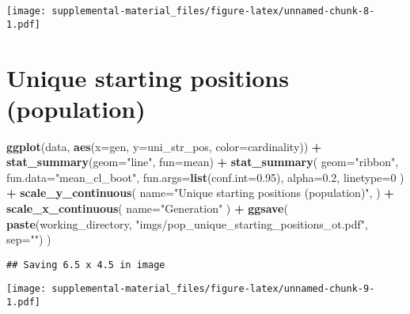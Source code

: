 \documentclass[]{book}
\newenvironment{Shaded}{\begin{snugshade}}{\end{snugshade}}
\newcommand{\DataTypeTok}[1]{\textcolor[rgb]{0.13,0.29,0.53}{#1}}
\newcommand{\DecValTok}[1]{\textcolor[rgb]{0.00,0.00,0.81}{#1}}
\newcommand{\FloatTok}[1]{\textcolor[rgb]{0.00,0.00,0.81}{#1}}
\newcommand{\KeywordTok}[1]{\textcolor[rgb]{0.13,0.29,0.53}{\textbf{#1}}}
\newcommand{\NormalTok}[1]{#1}
\newcommand{\OperatorTok}[1]{\textcolor[rgb]{0.81,0.36,0.00}{\textbf{#1}}}
\newcommand{\StringTok}[1]{\textcolor[rgb]{0.31,0.60,0.02}{#1}}
\begin{document}
\texttt{[image: supplemental-material\_files/figure-latex/unnamed-chunk-8-1.pdf]}

\hypertarget{unique-starting-positions-population}{%
\section{Unique starting positions (population)}\label{unique-starting-positions-population}}

\begin{Shaded}
\begin{Highlighting}[]
\KeywordTok{ggplot}\NormalTok{(data, }\KeywordTok{aes}\NormalTok{(}\DataTypeTok{x=}\NormalTok{gen, }\DataTypeTok{y=}\NormalTok{uni_str_pos, }\DataTypeTok{color=}\NormalTok{cardinality)) }\OperatorTok{+}
\StringTok{  }\KeywordTok{stat_summary}\NormalTok{(}\DataTypeTok{geom=}\StringTok{"line"}\NormalTok{, }\DataTypeTok{fun=}\NormalTok{mean) }\OperatorTok{+}
\StringTok{  }\KeywordTok{stat_summary}\NormalTok{(}
    \DataTypeTok{geom=}\StringTok{"ribbon"}\NormalTok{,}
    \DataTypeTok{fun.data=}\StringTok{"mean_cl_boot"}\NormalTok{,}
    \DataTypeTok{fun.args=}\KeywordTok{list}\NormalTok{(}\DataTypeTok{conf.int=}\FloatTok{0.95}\NormalTok{),}
    \DataTypeTok{alpha=}\FloatTok{0.2}\NormalTok{,}
    \DataTypeTok{linetype=}\DecValTok{0}
\NormalTok{  ) }\OperatorTok{+}
\StringTok{  }\KeywordTok{scale_y_continuous}\NormalTok{(}
    \DataTypeTok{name=}\StringTok{"Unique starting positions (population)"}\NormalTok{,}
\NormalTok{  ) }\OperatorTok{+}
\StringTok{  }\KeywordTok{scale_x_continuous}\NormalTok{(}
    \DataTypeTok{name=}\StringTok{"Generation"}
\NormalTok{  ) }\OperatorTok{+}
\StringTok{  }\KeywordTok{ggsave}\NormalTok{(}
    \KeywordTok{paste}\NormalTok{(working_directory, }\StringTok{"imgs/pop_unique_starting_positions_ot.pdf"}\NormalTok{, }\DataTypeTok{sep=}\StringTok{""}\NormalTok{)}
\NormalTok{  )}
\end{Highlighting}
\end{Shaded}

\begin{verbatim}
## Saving 6.5 x 4.5 in image
\end{verbatim}

\texttt{[image: supplemental-material\_files/figure-latex/unnamed-chunk-9-1.pdf]}
\end{document}
